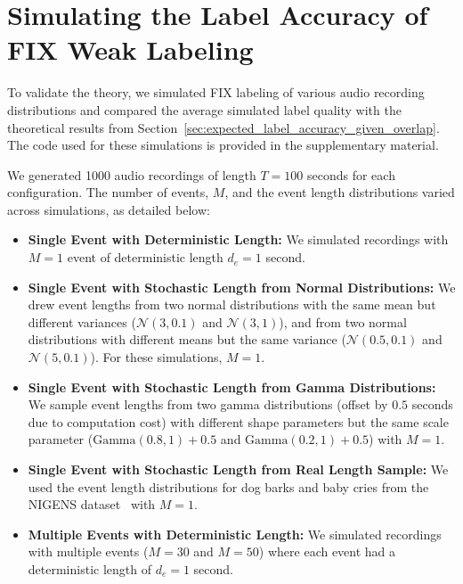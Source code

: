 \section{Simulating the Label Accuracy of FIX Weak Labeling}
\label{sec:simulation}

To validate the theory, we simulated FIX labeling of various audio recording distributions and compared the average simulated label quality with the theoretical results from Section~\ref{sec:expected_label_accuracy_given_overlap}. The code used for these simulations is provided in the supplementary material.

We generated 1000 audio recordings of length $T=100$ seconds for each configuration. The number of events, $M$, and the event length distributions varied across simulations, as detailed below:

\begin{itemize}
    \item \textbf{Single Event with Deterministic Length:} We simulated recordings with $M=1$ event of deterministic length $d_e = 1$ second.

    \item \textbf{Single Event with Stochastic Length from Normal Distributions:} We drew event lengths from two normal distributions with the same mean but different variances ($\mathcal{N}(3, 0.1)$ and $\mathcal{N}(3, 1)$), and from two normal distributions with different means but the same variance ($\mathcal{N}(0.5, 0.1)$ and $\mathcal{N}(5, 0.1)$). For these simulations, $M=1$.
    
    \item \textbf{Single Event with Stochastic Length from Gamma Distributions:} We sample event lengths from two gamma distributions (offset by $0.5$ seconds due to computation cost) with different shape parameters but the same scale parameter ($\text{Gamma}(0.8, 1) + 0.5$ and $\text{Gamma}(0.2, 1) + 0.5$) with $M=1$.
    
    \item \textbf{Single Event with Stochastic Length from Real Length Sample:} We used the event length distributions for dog barks and baby cries from the NIGENS dataset~\citep{Trowitzsch2019} with $M=1$.
    
    \item \textbf{Multiple Events with Deterministic Length:}  We simulated recordings with multiple events ($M=30$ and $M=50$) where each event had a deterministic length of $d_e = 1$ second.
\end{itemize}

